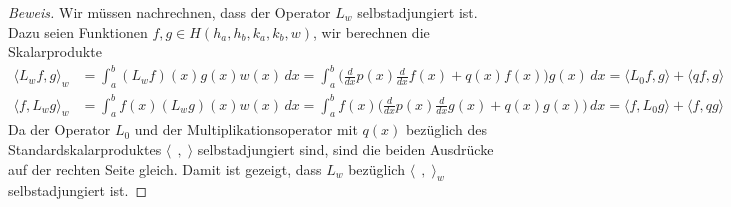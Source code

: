 \begin{proof}[Beweis]
Wir müssen nachrechnen, dass der Operator $L_w$ selbstadjungiert ist.
Dazu seien Funktionen $f,g\in H(h_a,h_b,k_a,k_b,w)$, wir berechnen die
Skalarprodukte
\begin{align*}
\langle L_wf,g\rangle_w
&=
\int_a^b (L_wf)(x)g(x)w(x)\,dx
=
\int_a^b
\biggl(
\frac{d}{dx}p(x)\frac{d}{dx}f(x) + 
q(x) f(x)
\biggr) g(x)\,dx
=
\langle L_0f,g\rangle + \langle qf,g\rangle
\\
\langle f,L_wg\rangle_w
&=
\int_a^b f(x)(L_wg)(x)w(x)\,dx
=
\int_a^b
f(x)
\biggl(
\frac{d}{dx}p(x)\frac{d}{dx}g(x) + 
q(x) g(x)
\biggr) \,dx
=
\langle f,L_0g\rangle + \langle f,qg\rangle
\end{align*}
Da der Operator $L_0$ und der Multiplikationsoperator mit $q(x)$ bezüglich
des Standardskalarproduktes $\langle\;\,,\;\rangle$ selbstadjungiert sind,
sind die beiden Ausdrücke auf der rechten Seite gleich.
Damit ist gezeigt, dass $L_w$ bezüglich $\langle\;\,,\;\rangle_w$
selbstadjungiert ist.
\end{proof}

